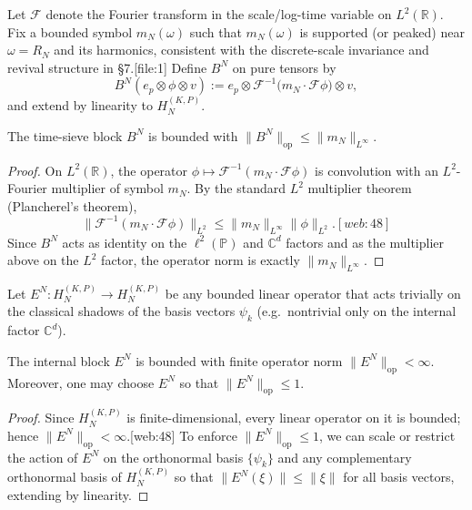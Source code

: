 \documentclass[11pt]{article}
\begin{document}
\begin{definition}
Let \(\mathscr{F}\) denote the Fourier transform in the scale/log-time
variable on \(L^2(\mathbb{R})\). Fix a bounded symbol
\(m_N(\omega)\) such that \(m_N(\omega)\) is supported (or peaked) near
\(\omega = R_N\) and its harmonics, consistent with the discrete-scale
invariance and revival structure in §7.[file:1]
Define \(B^N\) on pure tensors by
\[
B^N(e_p \otimes \phi \otimes v)
:= e_p \otimes \mathscr{F}^{-1}\bigl(m_N \cdot \mathscr{F}\phi\bigr)
  \otimes v,
\]
and extend by linearity to \(H_N^{(K,P)}\).
\end{definition}

\begin{lemma}
\label{lem:B-norm}
The time-sieve block \(B^N\) is bounded with
\(\|B^N\|_{\text{op}} \le \|m_N\|_{L^\infty}\).
\end{lemma}

\begin{proof}
On \(L^2(\mathbb{R})\), the operator
\(\phi \mapsto \mathscr{F}^{-1}(m_N \cdot \mathscr{F}\phi)\) is
convolution with an \(L^2\)-Fourier multiplier of symbol \(m_N\).
By the standard $L^2$ multiplier theorem (Plancherel's theorem),
\[
\|\mathscr{F}^{-1}(m_N \cdot \mathscr{F}\phi)\|_{L^2}
\le \|m_N\|_{L^\infty} \|\phi\|_{L^2}.[web:48]
\]
Since \(B^N\) acts as identity on the \(\ell^2(\mathbb{P})\) and
\(\mathbb{C}^d\) factors and as the multiplier above on the \(L^2\)
factor, the operator norm is exactly \(\|m_N\|_{L^\infty}\).
\end{proof}

\begin{definition}
Let \(E^N: H_N^{(K,P)} \to H_N^{(K,P)}\) be any bounded linear operator
that acts trivially on the classical shadows of the basis vectors
\(\psi_k\) (e.g.\ nontrivial only on the internal factor \(\mathbb{C}^d\)).
\end{definition}

\begin{lemma}
\label{lem:E-norm}
The internal block \(E^N\) is bounded with finite operator norm
\(\|E^N\|_{\text{op}}<\infty\). Moreover, one may choose \(E^N\) so that
\(\|E^N\|_{\text{op}} \le 1\).
\end{lemma}

\begin{proof}
Since \(H_N^{(K,P)}\) is finite-dimensional, every linear operator on it
is bounded; hence \(\|E^N\|_{\text{op}}<\infty\).[web:48]
To enforce \(\|E^N\|_{\text{op}}\le 1\), we can scale or restrict the
action of \(E^N\) on the orthonormal basis \(\{\psi_k\}\) and any
complementary orthonormal basis of \(H_N^{(K,P)}\) so that
\(\|E^N(\xi)\| \le \|\xi\|\) for all basis vectors, extending by linearity.
\end{proof}
\end{document}
